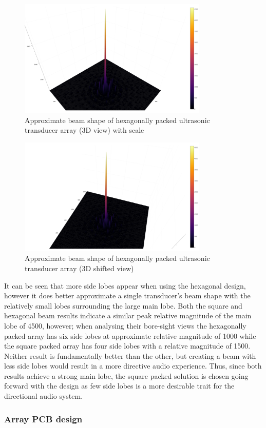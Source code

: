 \begin{figure}[ht!]
    \centering
    \includegraphics[width=0.8\textwidth]{Figures/arraySim/hex/beampat3dplaneview.png}
    \caption{Approximate beam shape of hexagonally packed ultrasonic transducer array (3D view) with scale}
    \label{fig:hex_elem_3Dbeamscale}
\end{figure}

\begin{figure}[ht!]
    \centering
    \includegraphics[width=0.8\textwidth]{Figures/arraySim/hex/beampat3d.png}
    \caption{Approximate beam shape of hexagonally packed ultrasonic transducer array (3D shifted view)}
    \label{fig:hex_elem_3Dbeam}
\end{figure}

It can be seen that more side lobes appear when using the hexagonal design, however it does better approximate a single transducer's beam shape with the relatively small lobes surrounding the large main lobe.
Both the square and hexagonal beam results indicate a similar peak relative magnitude of the main lobe of 4500, however; when analysing their bore-sight views the hexagonally packed array has six side lobes at approximate relative magnitude of 1000 while the square packed array has four side lobes with a relative magnitude of 1500. Neither result is fundamentally better than the other, but creating a beam with less side lobes would result in a more directive audio experience. Thus, since both results achieve a strong main lobe, the square packed solution is chosen going forward with the design as few side lobes is a more desirable trait for the directional audio system.

\subsubsection{Array PCB design}

